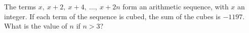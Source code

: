 The terms $x,\ x+2,\ x+4,\ \dots,\ x+2n$ form an arithmetic sequence, with $x$ an integer. If each term of the sequence is cubed, the sum of the cubes is $-1197$. What is the value of $n$ if $n>3$?
